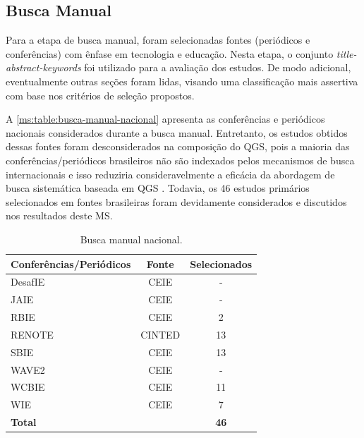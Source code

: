 \subsection{Busca Manual}
\label{ms:conducao-busca-manual}

Para a etapa de busca manual, foram selecionadas fontes (periódicos e conferências) com ênfase em tecnologia e educação. %
Nesta etapa, o conjunto \textit{title-abstract-keywords} foi utilizado para a avaliação dos estudos. De modo adicional, eventualmente outras seções foram lidas, visando uma classificação mais assertiva com base nos critérios de seleção propostos.

A \autoref{ms:table:busca-manual-nacional} apresenta as conferências e periódicos nacionais considerados durante a busca manual. Entretanto, os estudos obtidos dessas fontes foram desconsiderados na composição do QGS, pois a maioria das conferências/periódicos brasileiros não são indexados pelos mecanismos de busca internacionais e isso reduziria consideravelmente a eficácia da abordagem de busca sistemática baseada em QGS \cite{Zhang2011}. Todavia, os 46 estudos primários selecionados em fontes brasileiras foram devidamente considerados e discutidos nos resultados deste MS. 

\begin{table}[htbp]
\centering
\caption{Busca manual nacional.}
\label{ms:table:busca-manual-nacional}
\begin{tabular}{lcc}
\hline
\textbf{Conferências/Periódicos} & \textbf{Fonte} & \textbf{Selecionados} \\ \hline
DesafIE                          & CEIE           & -                     \\
JAIE                             & CEIE           & -                     \\
RBIE                             & CEIE           & 2                     \\
RENOTE                           & CINTED         & 13                    \\
SBIE                             & CEIE           & 13                    \\
WAVE2                            & CEIE           & -                     \\
WCBIE                            & CEIE           & 11                    \\
WIE                              & CEIE           & 7                     \\
\multicolumn{2}{l}{\textbf{Total}}                & \textbf{46}           \\ \hline
\end{tabular}
\fautor
\end{table}

